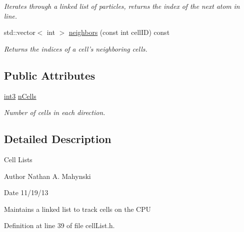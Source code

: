 \begin{DoxyCompactItemize}
\begin{DoxyCompactList}\small\item\em Iterates through a linked list of particles, returns the index of the next atom in line. \end{DoxyCompactList}\item 
\hypertarget{classcell_list__cpu_aeaf165c887b13bfa7f7c1a8b70102aff}{std\-::vector$<$ int $>$ \hyperlink{classcell_list__cpu_aeaf165c887b13bfa7f7c1a8b70102aff}{neighbors} (const int cell\-I\-D) const }\label{classcell_list__cpu_aeaf165c887b13bfa7f7c1a8b70102aff}

\begin{DoxyCompactList}\small\item\em Returns the indices of a cell's neighboring cells. \end{DoxyCompactList}\end{DoxyCompactItemize}
\subsection*{Public Attributes}
\begin{DoxyCompactItemize}
\item 
\hypertarget{classcell_list__cpu_ae86e1c9604a39bc8a493fa0f6538fd37}{\hyperlink{structint3}{int3} \hyperlink{classcell_list__cpu_ae86e1c9604a39bc8a493fa0f6538fd37}{n\-Cells}}\label{classcell_list__cpu_ae86e1c9604a39bc8a493fa0f6538fd37}

\begin{DoxyCompactList}\small\item\em Number of cells in each direction. \end{DoxyCompactList}\end{DoxyCompactItemize}


\subsection{Detailed Description}
Cell Lists \begin{DoxyAuthor}{Author}
Nathan A. Mahynski 
\end{DoxyAuthor}
\begin{DoxyDate}{Date}
11/19/13
\end{DoxyDate}
Maintains a linked list to track cells on the C\-P\-U 

Definition at line 39 of file cell\-List.\-h.



